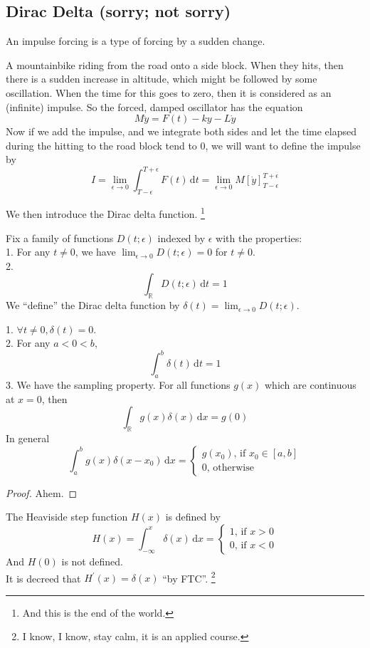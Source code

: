 \subsection{Dirac Delta (sorry; not sorry)}
\begin{definition}
    An impulse forcing is a type of forcing by a sudden change.
\end{definition}
\begin{example}
    A mountainbike riding from the road onto a side block.
    When they hits, then there is a sudden increase in altitude, which might be followed by some oscillation.
    When the time for this goes to zero, then it is considered as an (infinite) impulse.
    So the forced, damped oscillator has the equation
    $$M\ddot{y}=F(t)-ky-L\dot{y}$$
    Now if we add the impulse, and we integrate both sides and let the time elapsed during the hitting to the road block tend to $0$, we will want to define the impulse by
    $$I=\lim_{\epsilon\to 0}\int_{T-\epsilon}^{T+\epsilon}F(t)\,\mathrm dt=\lim_{\epsilon\to 0}M[\dot{y}]^{T+\epsilon}_{T-\epsilon}$$
\end{example}
We then introduce the Dirac delta function.
\footnote{And this is the end of the world.}
\begin{definition}
    Fix a family of functions $D(t;\epsilon)$ indexed by $\epsilon$ with the properties:\\
    1. For any $t\neq 0$, we have $\lim_{\epsilon\to0}D(t;\epsilon)=0$ for $t\neq 0$.\\
    2.
    $$\int_{\mathbb R}D(t;\epsilon)\,\mathrm dt=1$$
    We ``define'' the Dirac delta function by $\delta(t)=\lim_{\epsilon\to 0}D(t;\epsilon)$.
\end{definition}
\begin{proposition}
    1. $\forall t\neq 0,\delta(t)=0$.\\
    2. For any $a<0<b$,
    $$\int_a^b\delta(t)\,\mathrm dt=1$$
    3. We have the sampling property.
    For all functions $g(x)$ which are continuous at $x=0$, then
    $$\int_{\mathbb{R}}g(x)\delta(x)\,\mathrm dx=g(0)$$
    In general
    $$\int_a^bg(x)\delta(x-x_0)\,\mathrm dx=
    \begin{cases}
        g(x_0)\text{, if $x_0\in[a,b]$}\\
        0\text{, otherwise}
    \end{cases}$$
\end{proposition}
\begin{proof}
    Ahem.
\end{proof}
\begin{definition}
    The Heaviside step function $H(x)$ is defined by
    $$H(x)=\int_{-\infty}^x\delta(x)\,\mathrm dx=
    \begin{cases}
        1\text{, if $x>0$}\\
        0\text{, if $x<0$}
    \end{cases}$$
    And $H(0)$ is not defined.\\
    It is decreed that $H^\prime(x)=\delta(x)$ ``by FTC''.
    \footnote{I know, I know, stay calm, it is an applied course.}
\end{definition}
